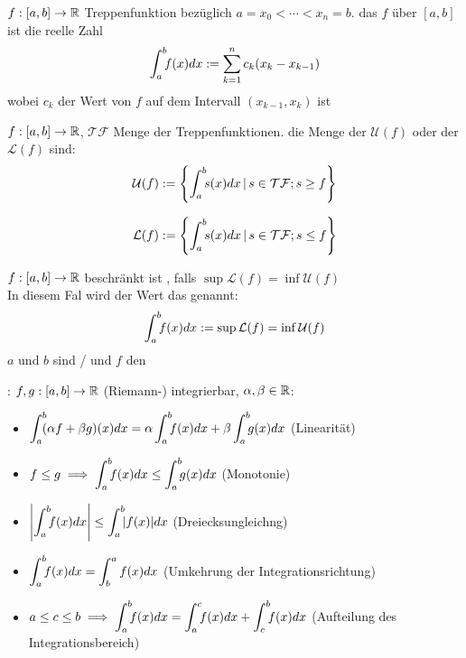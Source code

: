 \Def $f: [a, b] \to \mathbb{R}$ Treppenfunktion bezüglich $a = x_0 < \cdots < x_n = b$. das
 $f$ über $[a, b]$ ist die reelle Zahl
$$\int_a^b \hspace{-4pt} f(x) dx := \sum_{k=1}^{n} c_k(x_k - x_{k-1})$$
wobei $c_k$ der Wert von $f$ auf dem Intervall $(x_{k-1}, x_k)$ ist

\Def $f: [a,b] \to \mathbb{R}$, $\mathcal{TF}$ Menge der Treppenfunktionen.
die Menge der  $\mathcal U (f)$ oder der 
$\mathcal L (f)$ sind:
$$\mathcal U (f) := \left\{\int_a^b \hspace{-4pt}s(x)dx \, | \, s \in \mathcal{TF}; s \ge f\right\}$$

$$\mathcal L (f) := \left\{\int_a^b \hspace{-4pt}s(x)dx \, | \, s \in \mathcal{TF}; s \le f\right\}$$

\Def $f: [a, b] \to \mathbb{R}$ beschränkt ist ,
falls $\sup \mathcal L (f) = \inf \mathcal U (f)$ \\
In diesem Fal wird der Wert das  genannt:
$$\int_a^b \hspace{-4pt}f(x) dx := \sup \mathcal L (f) = \inf \mathcal U (f)$$
$a$ und $b$ sind / und $f$ den 

\Satz {}: $f,g: [a,b] \to \mathbb{R}$ (Riemann-) integrierbar,
$\alpha, \beta \in \mathbb{R}$:
\vspace{-0.6em}
\begin{itemize}
    \item $\displaystyle \int_a^b \hspace{-4pt} (\alpha f + \beta g)(x) dx = \alpha \int_a^b \hspace{-4pt} f(x) dx + \beta \int_a^b \hspace{-4pt} g(x) dx$ (Linearität)
    \item $\displaystyle f \le g \implies \int_a^b \hspace{-4pt} f(x) dx \le \int_a^b \hspace{-4pt}g(x) dx$ (Monotonie)
    \item $\displaystyle \left|\int_a^b \hspace{-4pt} f(x) dx\right| \le \int_a^b \hspace{-4pt} |f(x)| dx$ (Dreiecksungleichng)
    \item $\displaystyle \int_a^b \hspace{-4pt} f(x) dx = \int_{b}^{a} f(x) dx$ (Umkehrung der Integrationsrichtung)
    \item $\displaystyle a \le c \le b \implies \int_a^b \hspace{-4pt} f(x) dx = \int_a^c \hspace{-4pt} f(x) dx + \int_c^b \hspace{-4pt} f(x) dx$ (Aufteilung des Integrationsbereich)
\end{itemize}

